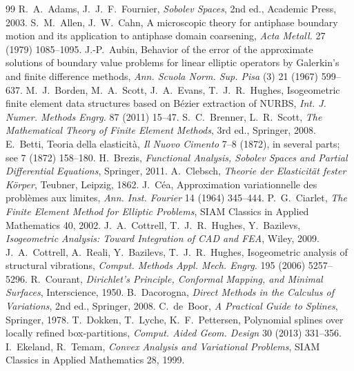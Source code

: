 \begin{chapterbib}{99}
 R.~A.~Adams, J.~J.~F.~Fournier, \emph{Sobolev Spaces}, 2nd ed., Academic Press, 2003.
 S.~M.~Allen, J.~W.~Cahn, A microscopic theory for antiphase boundary motion and its application to antiphase domain coarsening, \emph{Acta Metall.} 27 (1979) 1085--1095.
 J.-P.~Aubin, Behavior of the error of the approximate solutions of boundary value problems for linear elliptic operators by Galerkin's and finite difference methods, \emph{Ann. Scuola Norm. Sup. Pisa} (3) 21 (1967) 599--637.
 M.~J.~Borden, M.~A.~Scott, J.~A.~Evans, T.~J.~R.~Hughes, Isogeometric finite element data structures based on B\'ezier extraction of NURBS, \emph{Int. J. Numer. Methods Engrg.} 87 (2011) 15--47.
 S.~C.~Brenner, L.~R.~Scott, \emph{The Mathematical Theory of Finite Element Methods}, 3rd ed., Springer, 2008.
 E.~Betti, Teoria della elasticit\`a, \emph{Il Nuovo Cimento} 7--8 (1872), in several parts; see 7 (1872) 158--180.
 H.~Brezis, \emph{Functional Analysis, Sobolev Spaces and Partial Differential Equations}, Springer, 2011.
 A.~Clebsch, \emph{Theorie der Elasticit\"at fester K\"orper}, Teubner, Leipzig, 1862.
 J.~C\'ea, Approximation variationnelle des probl\`emes aux limites, \emph{Ann. Inst. Fourier} 14 (1964) 345--444.
 P.~G.~Ciarlet, \emph{The Finite Element Method for Elliptic Problems}, SIAM Classics in Applied Mathematics 40, 2002.
 J.~A.~Cottrell, T.~J.~R.~Hughes, Y.~Bazilevs, \emph{Isogeometric Analysis: Toward Integration of CAD and FEA}, Wiley, 2009.
 J.~A.~Cottrell, A.~Reali, Y.~Bazilevs, T.~J.~R.~Hughes, Isogeometric analysis of structural vibrations, \emph{Comput. Methods Appl. Mech. Engrg.} 195 (2006) 5257--5296.
 R.~Courant, \emph{Dirichlet's Principle, Conformal Mapping, and Minimal Surfaces}, Interscience, 1950.
 B.~Dacorogna, \emph{Direct Methods in the Calculus of Variations}, 2nd ed., Springer, 2008.
 C.~de~Boor, \emph{A Practical Guide to Splines}, Springer, 1978.
 T.~Dokken, T.~Lyche, K.~F.~Pettersen, Polynomial splines over locally refined box-partitions, \emph{Comput. Aided Geom. Design} 30 (2013) 331--356.
 I.~Ekeland, R.~Temam, \emph{Convex Analysis and Variational Problems}, SIAM Classics in Applied Mathematics 28, 1999.

\end{chapterbib}
